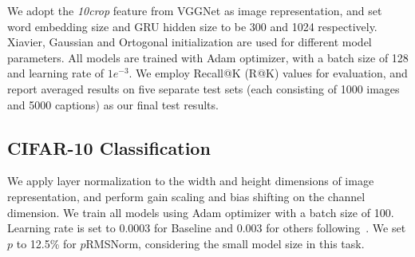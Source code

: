 \documentclass{article}
\begin{document}
We adopt the \textit{10crop} feature from VGGNet as image representation, and set word embedding size and GRU hidden size to be 300 and 1024 respectively. Xiavier, Gaussian and Ortogonal initialization are used for different model parameters. All models are trained with Adam optimizer, with a batch size of 128 and learning rate of $1e^{-3}$. We employ Recall@K (R@K) values for evaluation, and report averaged results on five separate test sets (each consisting of 1000 images and 5000 captions) as our final test results.

\subsection{CIFAR-10 Classification}\label{app_cifar}

We apply layer normalization to the width and height dimensions of image representation, and perform gain scaling and bias shifting on the channel dimension. We train all models using Adam optimizer with a batch size of 100. Learning rate is set to 0.0003 for Baseline and 0.003 for others following~\cite{NIPS2016_6114}. We set $p$ to 12.5\% for $p$RMSNorm, considering the small model size in this task. 
\end{document}

